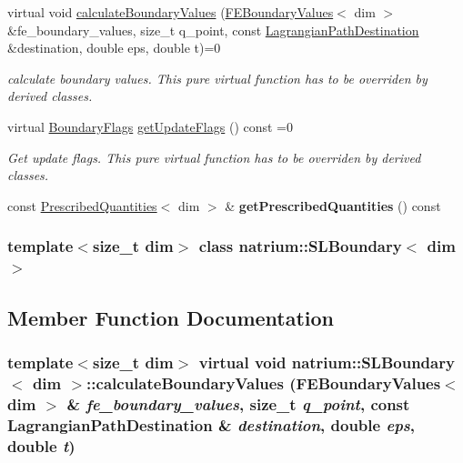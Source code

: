 \begin{DoxyCompactItemize}
\item 
virtual void \hyperlink{classnatrium_1_1SLBoundary_a7c166745b087afdd137013f994733b89}{calculateBoundaryValues} (\hyperlink{classnatrium_1_1FEBoundaryValues}{FEBoundaryValues}$<$ dim $>$ \&fe\_\-boundary\_\-values, size\_\-t q\_\-point, const \hyperlink{structnatrium_1_1LagrangianPathDestination}{LagrangianPathDestination} \&destination, double eps, double t)=0
\begin{DoxyCompactList}\small\item\em calculate boundary values. This pure virtual function has to be overriden by derived classes. \item\end{DoxyCompactList}\item 
virtual \hyperlink{namespacenatrium_a93b2a3d564675413b9f6cc88c60f46af}{BoundaryFlags} \hyperlink{classnatrium_1_1SLBoundary_ad2b9a7f797b3af9b6493f9e9c5da5434}{getUpdateFlags} () const =0
\begin{DoxyCompactList}\small\item\em Get update flags. This pure virtual function has to be overriden by derived classes. \item\end{DoxyCompactList}\item 
\hypertarget{classnatrium_1_1SLBoundary_a1505c5690482cb586d03905923c42942}{
const \hyperlink{classnatrium_1_1PrescribedQuantities}{PrescribedQuantities}$<$ dim $>$ \& {\bfseries getPrescribedQuantities} () const }
\label{classnatrium_1_1SLBoundary_a1505c5690482cb586d03905923c42942}

\end{DoxyCompactItemize}
\subsubsection*{template$<$size\_\-t dim$>$ class natrium::SLBoundary$<$ dim $>$}



\subsection{Member Function Documentation}
\hypertarget{classnatrium_1_1SLBoundary_a7c166745b087afdd137013f994733b89}{
\subsubsection[{calculateBoundaryValues}]{\setlength{\rightskip}{0pt plus 5cm}template$<$size\_\-t dim$>$ virtual void {\bf natrium::SLBoundary}$<$ dim $>$::calculateBoundaryValues ({\bf FEBoundaryValues}$<$ dim $>$ \& {\em fe\_\-boundary\_\-values}, \/  size\_\-t {\em q\_\-point}, \/  const {\bf LagrangianPathDestination} \& {\em destination}, \/  double {\em eps}, \/  double {\em t})}}
\label{classnatrium_1_1SLBoundary_a7c166745b087afdd137013f994733b89}


